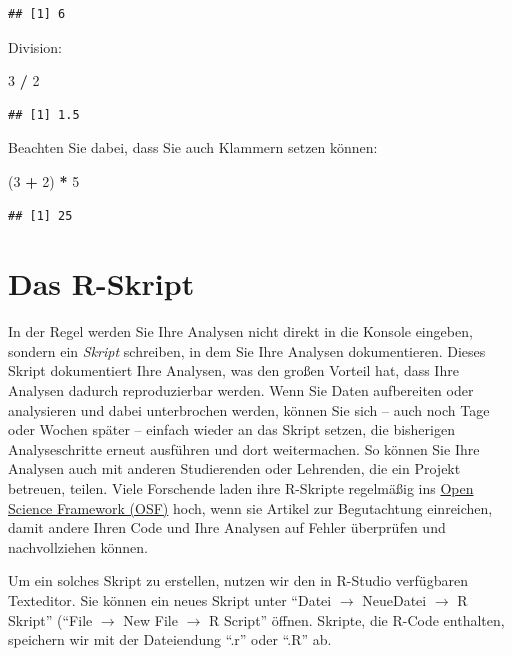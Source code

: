\documentclass[
  ngerman,
]{book}
\newenvironment{Shaded}{\begin{snugshade}}{\end{snugshade}}
\newcommand{\DecValTok}[1]{\textcolor[rgb]{0.00,0.00,0.81}{#1}}
\newcommand{\NormalTok}[1]{#1}
\newcommand{\SpecialCharTok}[1]{\textcolor[rgb]{0.81,0.36,0.00}{\textbf{#1}}}
\begin{document}
\begin{verbatim}
## [1] 6
\end{verbatim}

Division:

\begin{Shaded}
\begin{Highlighting}[]
\DecValTok{3} \SpecialCharTok{/} \DecValTok{2}
\end{Highlighting}
\end{Shaded}

\begin{verbatim}
## [1] 1.5
\end{verbatim}

Beachten Sie dabei, dass Sie auch Klammern setzen können:

\begin{Shaded}
\begin{Highlighting}[]
\NormalTok{(}\DecValTok{3} \SpecialCharTok{+} \DecValTok{2}\NormalTok{) }\SpecialCharTok{*} \DecValTok{5}
\end{Highlighting}
\end{Shaded}

\begin{verbatim}
## [1] 25
\end{verbatim}

\section{Das R-Skript}\label{das-r-skript}

In der Regel werden Sie Ihre Analysen nicht direkt in die Konsole eingeben, sondern ein \emph{Skript} schreiben, in dem Sie Ihre Analysen dokumentieren. Dieses Skript dokumentiert Ihre Analysen, was den großen Vorteil hat, dass Ihre Analysen dadurch reproduzierbar werden. Wenn Sie Daten aufbereiten oder analysieren und dabei unterbrochen werden, können Sie sich -- auch noch Tage oder Wochen später -- einfach wieder an das Skript setzen, die bisherigen Analyseschritte erneut ausführen und dort weitermachen. So können Sie Ihre Analysen auch mit anderen Studierenden oder Lehrenden, die ein Projekt betreuen, teilen. Viele Forschende laden ihre R-Skripte regelmäßig ins \href{osf.io}{Open Science Framework (OSF)} hoch, wenn sie Artikel zur Begutachtung einreichen, damit andere Ihren Code und Ihre Analysen auf Fehler überprüfen und nachvollziehen können.

Um ein solches Skript zu erstellen, nutzen wir den in R-Studio verfügbaren Texteditor. Sie können ein neues Skript unter ``Datei \(\to\) NeueDatei \(\to\) R Skript'' (``File \(\to\) New File \(\to\) R Script'' öffnen. Skripte, die R-Code enthalten, speichern wir mit der Dateiendung ``.r'' oder ``.R'' ab.
\end{document}
